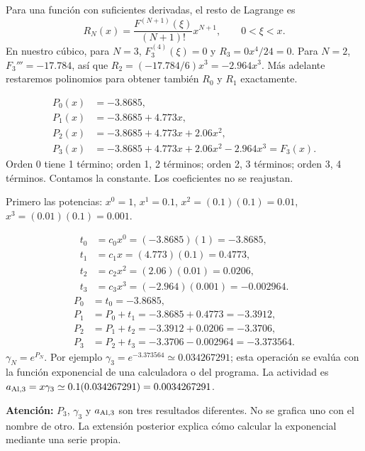 Para una función con suficientes derivadas, el resto de Lagrange es
\[
R_N(x)=\frac{F^{(N+1)}(\xi)}{(N+1)!}x^{N+1},\qquad 0<\xi<x.
\]
En nuestro cúbico, para $N=3$, $F_3^{(4)}(\xi)=0$ y $R_3=0x^4/24=0$. Para $N=2$, $F_3'''=-17.784$, así que $R_2=(-17.784/6)x^3=-2.964x^3$. Más adelante restaremos polinomios para obtener también $R_0$ y $R_1$ exactamente.


\begin{align*}
P_0(x)&=-3.8685,\\
P_1(x)&=-3.8685+4.773x,\\
P_2(x)&=-3.8685+4.773x+2.06x^2,\\
P_3(x)&=-3.8685+4.773x+2.06x^2-2.964x^3=F_3(x).
\end{align*}
Orden 0 tiene 1 término; orden 1, 2 términos; orden 2, 3 términos; orden 3, 4 términos. Contamos la constante. Los coeficientes no se reajustan.

Primero las potencias: $x^0=1$, $x^1=0.1$, $x^2=(0.1)(0.1)=0.01$, $x^3=(0.01)(0.1)=0.001$.

\begin{align*}
t_0&=c_0x^0=(-3.8685)(1)=-3.8685,\\
t_1&=c_1x=(4.773)(0.1)=0.4773,\\
t_2&=c_2x^2=(2.06)(0.01)=0.0206,\\
t_3&=c_3x^3=(-2.964)(0.001)=-0.002964.
\end{align*}
\begin{align*}
P_0&=t_0=-3.8685,\\
P_1&=P_0+t_1=-3.8685+0.4773=-3.3912,\\
P_2&=P_1+t_2=-3.3912+0.0206=-3.3706,\\
P_3&=P_2+t_3=-3.3706-0.002964=-3.373564.
\end{align*}
$\gamma_N=e^{P_N}$. Por ejemplo $\gamma_3=e^{-3.373564}\simeq0.034267291$; esta operación se evalúa con la función exponencial de una calculadora o del programa. La actividad es $a_{\mathrm{Al},3}=x\gamma_3\simeq0.1(0.034267291)=0.0034267291$.

\textbf{Atención:} $P_3$, $\gamma_3$ y $a_{\mathrm{Al},3}$ son tres resultados diferentes. No se grafica uno con el nombre de otro. La extensión posterior explica cómo calcular la exponencial mediante una serie propia.
